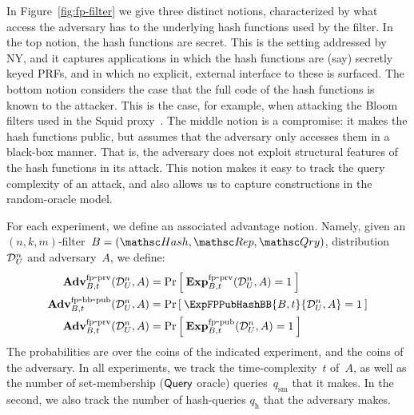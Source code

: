 In Figure~\ref{fig:fp-filter} we give three distinct notions, characterized by what access the adversary has to the underlying hash functions used by the filter.  In the top notion, the hash functions are secret.  This is the setting addressed by NY, and it captures applications in which the hash functions are (say) secretly keyed PRFs, and in which no explicit, external interface to these is surfaced.
%
The bottom notion considers the case that the full code of the hash functions is known to the attacker.  This is the case, for example, when attacking the Bloom filters used in the Squid proxy~\cite{xxx}.
%
The middle notion is a compromise: it makes the hash functions
public, but assumes that the adversary only accesses them in a
black-box manner.  That is, the adversary does not exploit
structural features of the hash functions in its attack.  This
notion makes it easy to track the query complexity of an attack, and
also allows us to capture constructions in the random-oracle model.
 

For each experiment, we define an associated advantage
notion.  Namely, given an $(n,k,m)$-filter~$B=(\Hash,\Rep,\Qry)$,
distribution~$\mathcal{D}_{U}^{n}$ and adversary~$A$, we define:
\begin{align*}
\AdvFPSecHash{B,t}{\distr{U}{n},A} &= \Prob{\ExpFPSecHash{B,t}{\distr{U}{n},A}=1} \\
\AdvFPPubHashBB{B,t}{\distr{U}{n},A} &= \Prob{\ExpFPPubHashBB{B,t}{\distr{U}{n},A}=1} \\
\AdvFPSecHash{B,t}{\distr{U}{n},A} &= \Prob{\ExpFPPubHash{B,t}{\distr{U}{n},A}=1}
\end{align*}
The probabilities are over the coins of the indicated experiment,
and the coins of the adversary.   In all experiments, we track the
time-complexity~$t$ of~$A$, as well as the number of set-membership
($\mathsf{Query}$ oracle) queries~$q_{\mathrm{sm}}$ that it makes.   In
the second, we also track the number of hash-queries
$q_{\mathrm{h}}$ that the adversary makes.

